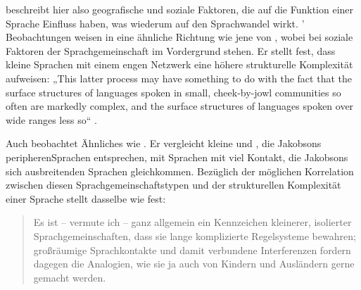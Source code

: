 \citet{Jakobson1929} beschreibt hier also geografische und soziale Faktoren, die auf die Funktion einer Sprache Einfluss haben, was wiederum auf den Sprachwandel wirkt. \citeauthor{Hymnes1975}’ \citeyearpar{Hymnes1975} Beobachtungen weisen in eine ähnliche Richtung wie jene von \citet{Jakobson1929}, wobei bei \citet{Hymnes1975} soziale Faktoren der Sprachgemeinschaft im Vordergrund stehen. Er stellt fest, dass kleine Sprachen mit einem engen Netzwerk eine höhere strukturelle Komplexität aufweisen: „This latter process may have something to do with the fact that the surface structures of languages spoken in small, cheek-by-jowl communities so often are markedly complex, and the surface structures of languages spoken over wide ranges less so“ \citep[50]{Hymnes1975}.

Auch \citet{Werner1975} beobachtet Ähnliches wie \citet{Jakobson1929}. Er vergleicht kleine und , die Jakobsons peripheren\linebreak Sprachen entsprechen, mit Sprachen mit viel Kontakt, die Jakobsons sich ausbreitenden Sprachen gleichkommen. Bezüglich der möglichen Korrelation zwischen diesen Sprachgemeinschaftstypen und der strukturellen Komplexität einer Sprache stellt \citet{Werner1975} dasselbe wie \citet{Jakobson1929} fest: 

\begin{quote}
Es ist – vermute ich – ganz allgemein ein Kennzeichen kleinerer, isolierter Sprachgemeinschaften, dass sie lange komplizierte Regelsysteme bewahren; großräumige Sprachkontakte und damit verbundene Interferenzen fordern dagegen die Analogien, wie sie ja auch von Kindern und Ausländern gerne gemacht werden. \citep[791]{Werner1975}
\end{quote}

